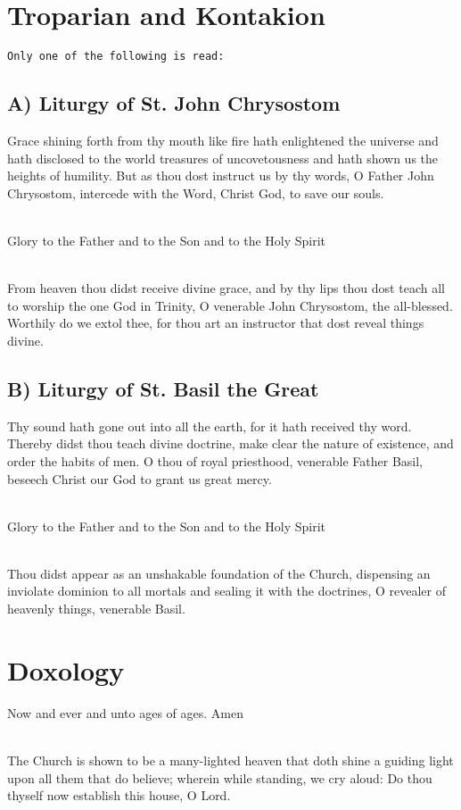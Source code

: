 \section*{Troparian and Kontakion}
\texttt{Only one of the following is read:}

\subsection*{A) Liturgy of St. John Chrysostom}
Grace shining forth from thy mouth like fire hath enlightened the universe
and hath disclosed to the world treasures of uncovetousness and hath shown
us the heights of humility.
But as thou dost instruct us by thy words,
O Father John Chrysostom, intercede with the Word,
Christ God, to save our souls.

\mbox{}\\
Glory to the Father and to the Son and to the Holy Spirit

\mbox{}\\
From heaven thou didst receive divine grace,
and by thy lips thou dost teach all to worship the one God in Trinity,
O venerable John Chrysostom,
the all-blessed.
Worthily do we extol thee,
for thou art an instructor that dost reveal things divine.

\subsection*{B) Liturgy of St. Basil the Great}
Thy sound hath gone out into all the earth, for it hath received thy word.
Thereby didst thou teach divine doctrine,
make clear the nature of existence,
and order the habits of men.
O thou of royal priesthood,
venerable Father Basil,
beseech Christ our God to grant us great mercy.

\mbox{}\\
Glory to the Father and to the Son and to the Holy Spirit

\mbox{}\\
Thou didst appear as an unshakable foundation of the Church,
dispensing an inviolate dominion to all mortals and sealing it with the
doctrines,
O revealer of heavenly things,
venerable Basil.

\section*{Doxology}

Now and ever and unto ages of ages. Amen

\mbox{}\\
The Church is shown to be a many-lighted heaven that doth shine a guiding
light upon all them that do believe;
wherein while standing, we cry aloud:
Do thou thyself now establish this house, O Lord.

